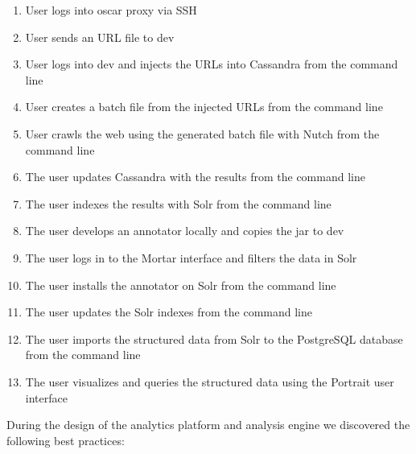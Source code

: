 \begin{enumerate}[Step 1.]
  \item User logs into oscar proxy via SSH
  \item User sends an URL file to dev
  \item User logs into dev and injects the URLs into Cassandra from the
    command line
  \item User creates a batch file from the injected URLs from the
    command line
  \item User crawls the web using the generated batch file with Nutch
    from the command line
  \item The user updates Cassandra with the results from the command
    line
  \item The user indexes the results with Solr from the command line
  \item The user develops an annotator locally and copies the jar to dev
  \item The user logs in to the Mortar interface and filters the data in
    Solr
  \item The user installs the annotator on Solr from the command line
  \item The user updates the Solr indexes from the command line
  \item The user imports the structured data from Solr to the PostgreSQL
    database from the command line 
  \item The user visualizes and queries the structured data using the
    Portrait user interface
\end{enumerate}

During the design of the analytics platform and analysis engine we
discovered the following best practices:

